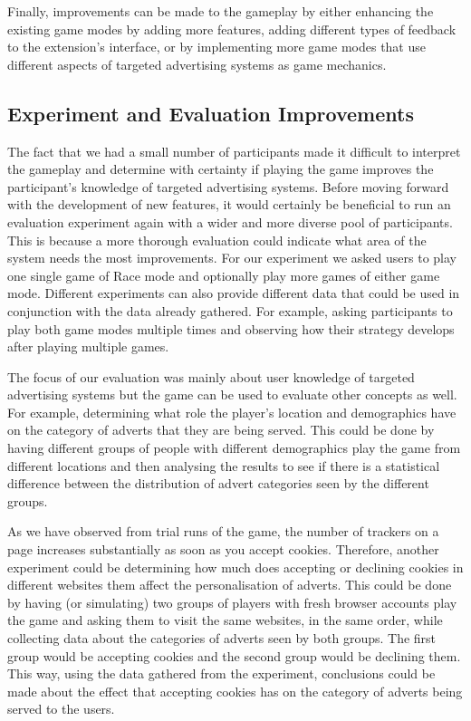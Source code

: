\documentclass{l4proj}
\begin{document}
Finally, improvements can be made to the gameplay by either enhancing the existing game modes by adding more features, adding different types of feedback to the extension's interface, or by implementing more game modes that use different aspects of targeted advertising systems as game mechanics.

\subsection{Experiment and Evaluation Improvements}
The fact that we had a small number of participants made it difficult to interpret the gameplay and determine with certainty if playing the game improves the participant's knowledge of targeted advertising systems. Before moving forward with the development of new features, it would certainly be beneficial to run an evaluation experiment again with a wider and more diverse pool of participants. This is because a more thorough evaluation could indicate what area of the system needs the most improvements. For our experiment we asked users to play one single game of Race mode and optionally play more games of either game mode. Different experiments can also provide different data that could be used in conjunction with the data already gathered. For example, asking participants to play both game modes multiple times and observing how their strategy develops after playing multiple games.

The focus of our evaluation was mainly about user knowledge of targeted advertising systems but the game can be used to evaluate other concepts as well. For example, determining what role the player's location and demographics have on the category of adverts that they are being served. This could be done by having different groups of people with different demographics play the game from different locations and then analysing the results to see if there is a statistical difference between the distribution of advert categories seen by the different groups. 

As we have observed from trial runs of the game, the number of trackers on a page increases substantially as soon as you accept cookies. Therefore, another experiment could be determining how much does accepting or declining cookies in different websites them affect the personalisation of adverts. This could be done by having (or simulating) two groups of players with fresh browser accounts play the game and asking them to visit the same websites, in the same order, while collecting data about the categories of adverts seen by both groups. The first group would be accepting cookies and the second group would be declining them. This way, using the data gathered from the experiment, conclusions could be made about the effect that accepting cookies has on the category of adverts being served to the users. 
\end{document}
